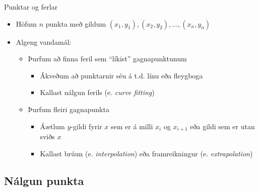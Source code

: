 \documentclass{beamer}
\begin{document}
\begin{frame}{Punktar og ferlar}
\begin{itemize}
 \item Höfum $n$ punkta með gildum $(x_1,y_1),(x_2,y_2),\ldots,(x_n,y_n)$
 \item Algeng vandamál:
 \begin{itemize}
  \item Þurfum að finna feril sem ``líkist'' gagnapunktunum
  \begin{itemize}
   \item Ákveðum að punktarnir séu á t.d. línu eða fleygboga
   \item Kallast nálgun ferils (e. \emph{curve fitting}) 
  \end{itemize}
  \item Þurfum fleiri gagnapunkta
  \begin{itemize}
   \item Áætlum $y$-gildi fyrir $x$ sem er á milli $x_i$ og $x_{i+1}$ eða gildi sem er utan sviðs $x$
   \item Kallast brúun (e. \emph{interpolation}) eða framreikningur (e. \emph{extrapolation})
  \end{itemize}
 \end{itemize}
\end{itemize}
\end{frame}

\subsection{Nálgun punkta}
\end{document}
